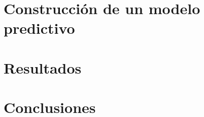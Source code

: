 \documentclass[10 pt]{article}
\begin{document}
\section{Construcción de un modelo predictivo}\label{pred}


\section{Resultados}\label{res}

\section{Conclusiones}\label{conc}






\newpage


\end{document}
